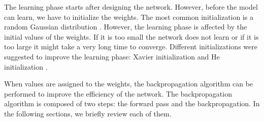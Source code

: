 The learning phase starts after designing the network. However, before the model can learn, we have to initialize the weights. The most common initialization is a random Gaussian distribution \cite{he_delving_2015}. However, the learning phase is affected by the initial values of the weights. If it is too small the network does not learn or if it is too large it might take a very long time to converge. Different initializations were suggested to improve the learning phase: Xavier initialization \cite{glorot_understanding_2010} and He initialization \cite{he_delving_2015}.

When values are assigned to the weights, the backpropagation algorithm can be performed to improve the efficiency of the network. The backpropagation algorithm is composed of two steps: the forward pass and the backpropagation. In the following sections, we briefly review each of them.
%

%

%
%

